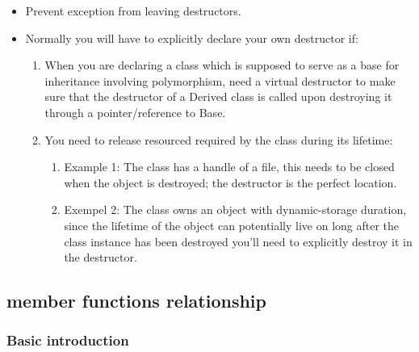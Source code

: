 \documentclass[a4paper,11pt,twoside]{book}
\begin{document}
\begin{itemize}
	
	\item Prevent exception from leaving destructors.
	
	\item Normally you will have to explicitly declare your own destructor if:
	\begin{enumerate}
		\item When you are declaring a class which is supposed to serve as a base for inheritance involving polymorphism, need a virtual destructor to make sure that the destructor of a Derived class is called upon destroying it through a pointer/reference to Base.
		
		\item You need to release resourced required by the class during its lifetime:
		\begin{enumerate}
			\item Example 1: The class has a handle of a file, this needs to be closed when the object is destroyed; the destructor is the perfect location.
			
			\item Exempel 2: The class owns an object with dynamic-storage duration, since the lifetime of the object can potentially live on long after the class instance has been destroyed you'll need to explicitly destroy it in the destructor.
		\end{enumerate}
	\end{enumerate}
\end{itemize}


\subsection{member functions relationship}

\subsubsection{Basic introduction}
\end{document}
